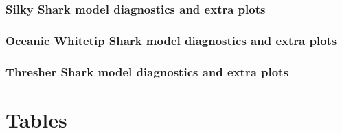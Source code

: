 \documentclass[12pt]{SCreport}
\begin{document}
 \subsubsection*{Silky Shark model diagnostics and extra plots}
 

\subsubsection*{Oceanic Whitetip Shark model diagnostics and extra plots}

 
  
\subsubsection*{Thresher Shark model diagnostics and extra plots}





%
\section{Tables}

 
\end{document}
